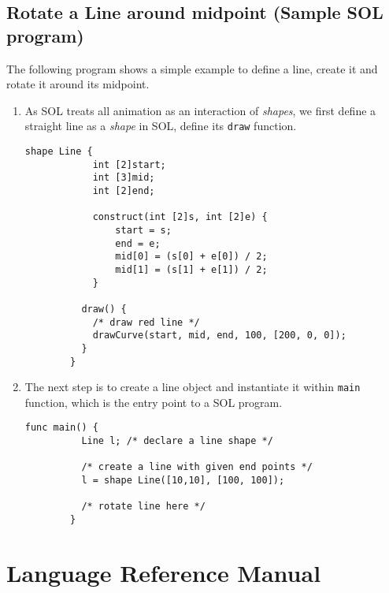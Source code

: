 \documentclass[letterpaper,12pt]{report}
\begin{document}
  \section{Rotate a Line around midpoint (Sample SOL program)}
  The following program shows a simple example to define a line, create it and rotate it around its midpoint.
  \begin{enumerate}
    \itemsep 0em
    \item As SOL treats all animation as an interaction of \textit{shapes}, we first define a straight line as a \textit{shape} in SOL, define its \texttt{draw} function.\\
      \begin{lstlisting}[style=sol]
        shape Line {
            int [2]start;
            int [3]mid;
            int [2]end;

            construct(int [2]s, int [2]e) {
                start = s;
                end = e;
                mid[0] = (s[0] + e[0]) / 2;
                mid[1] = (s[1] + e[1]) / 2;
            }

          draw() {
            /* draw red line */
            drawCurve(start, mid, end, 100, [200, 0, 0]);
          }
        }
      \end{lstlisting}

    \item The next step is to create a line object and instantiate it within \texttt{main} function, which is the entry point to a SOL program.\\
      \begin{lstlisting}[style=sol]
        func main() {
          Line l; /* declare a line shape */

          /* create a line with given end points */
          l = shape Line([10,10], [100, 100]);

          /* rotate line here */
        }
      \end{lstlisting}
  \end{enumerate}

\chapter{Language Reference Manual} \label{lrm}

  
\end{document}

